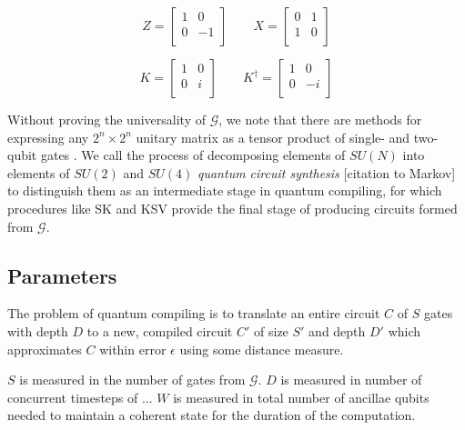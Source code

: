 \begin{displaymath}
Z = 
 \left[
  \begin{array}{cc}
    1 & 0 \\
    0 & -1 \\
  \end{array} \right]
\qquad
X = 
 \left[
  \begin{array}{cc}
    0 & 1 \\
    1 & 0 \\
  \end{array} \right]
\end{displaymath}

\begin{displaymath}
K = 
 \left[
  \begin{array}{cc}
    1 & 0 \\
    0 & i \\
  \end{array} \right]
\qquad
K^{\dagger} = 
 \left[
  \begin{array}{cc}
    1 & 0 \\
    0 & -i \\
  \end{array} \right]
\end{displaymath}

Without proving the universality of $\mathcal{G}$, we note that there are
methods for expressing any $2^n \times 2^n$ unitary matrix as a
tensor product of single- and two-qubit gates \cite{Bremner2002}. We call
the process of decomposing elements of $SU(N)$ into elements of
$SU(2)$ and $SU(4)$ \emph{quantum circuit synthesis}
[citation to Markov]
to distinguish them as
an intermediate stage in quantum compiling, for which procedures like SK and
KSV provide the final stage of producing circuits formed from $\mathcal{G}$.

\subsection{Parameters}

The problem of quantum compiling is to translate
an entire circuit $C$ of $S$ gates with depth
$D$ to a new, compiled circuit $C'$ of size $S'$ and depth $D'$ which approximates
$C$ within error $\epsilon$ using some distance measure.

$S$ is measured in the number of gates from $\mathcal{G}$. $D$ is measured in
number of concurrent timesteps of ... $W$ is measured in total number of 
ancillae qubits needed to maintain a coherent state for the duration of the
computation.

